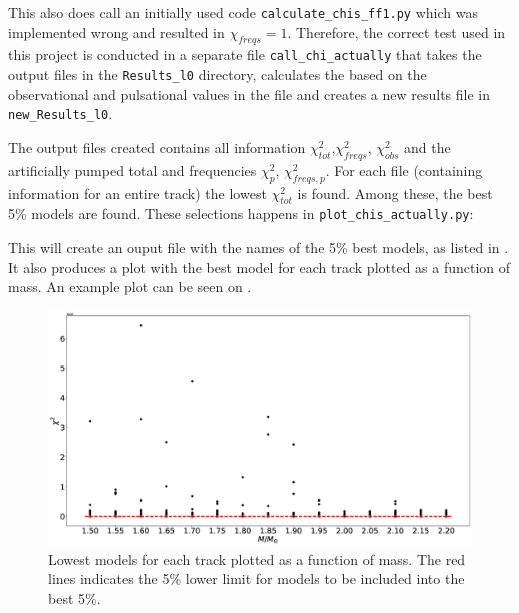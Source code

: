 

This also does call an initially used \chis code \texttt{calculate\_chis\_ff1.py} which was implemented wrong and resulted in $\chi_{freqs}=1$. Therefore, the correct \chis test used in this project is conducted in a separate file \texttt{call\_chi\_actually} that takes the output files in the \texttt{Results\_l0} directory, calculates the \chis based on the observational and pulsational values in the file and creates a new results file in \texttt{new\_Results\_l0}. 



The output files created contains all \chis information $\chi_{tot}^2$,$\chi_{freqs}^2$, $\chi_{obs}^2$ and the artificially pumped total \chis and frequencies $\chi_{p}^2$, $\chi_{freqs,p}^2$. For each file (containing information for an entire track) the lowest $\chi_{ tot}^2$ is found. Among these, the best 5\% models are found. These selections happens in \texttt{plot\_chis\_actually.py}:



This will create an ouput file with the names of the 5\% best models, as listed in . It also produces a plot with the best \chis model for each track plotted as a function of mass. An example plot can be seen on . 

\begin{figure}[htbp]
	\centering
	\includegraphics[width=1\textwidth]{appendix_stuff/plotchis.eps}
	\caption{Lowest \chis models for each track plotted as a function of mass. The red lines indicates the 5\% lower \chis limit for models to be included into the best 5\%.   }
	\label{selectfive}
\end{figure}


